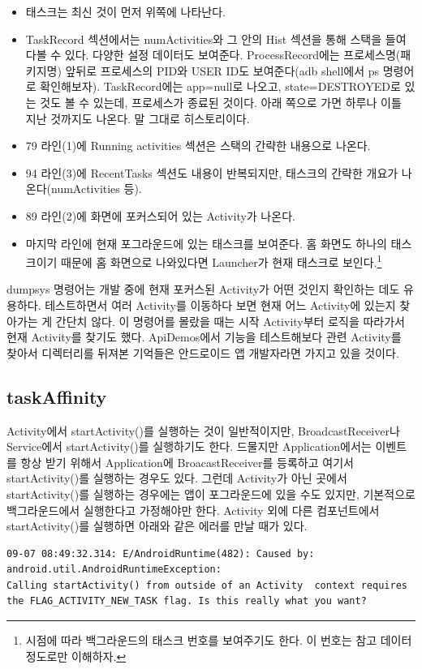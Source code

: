 \begin{itemize}
\item 태스크는 최신 것이 먼저 위쪽에 나타난다.
\item TaskRecord 섹션에서는 numActivities와 그 안의 Hist 섹션을 통해 스택을 들여다볼 수 있다. 다양한 설정 데이터도 보여준다. ProcessRecord에는 프로세스명(패키지명) 앞뒤로 프로세스의 PID와 USER ID도 보여준다(adb shell에서 ps 명령어로 확인해보자).
TaskRecord에는 app=null로 나오고, state=DESTROYED로 있는 것도 볼 수 있는데, 프로세스가 종료된 것이다. 아래 쪽으로 가면 하루나 이틀 지난 것까지도 나온다. 말 그대로 히스토리이다. 
\item 79 라인(1)에 Running activities 섹션은 스택의 간략한 내용으로 나온다.
\item 94 라인(3)에 RecentTasks 섹션도 내용이 반복되지만, 태스크의 간략한 개요가 나온다(numActivities 등).
\item 89 라인(2)에 화면에 포커스되어 있는 Activity가 나온다.
\item 마지막 라인에 현재 포그라운드에 있는 태스크를 보여준다. 홈 화면도 하나의 태스크이기 때문에 홈 화면으로 나와있다면 Launcher가 현재 태스크로 보인다.\footnote{시점에 따라 백그라운드의 태스크 번호를 보여주기도 한다. 이 번호는 참고 데이터 정도로만 이해하자.}
\end{itemize}
dumpsys 명령어는 개발 중에 현재 포커스된 Activity가 어떤 것인지 확인하는 데도 유용하다.
테스트하면서 여러 Activity를 이동하다 보면 현재 어느 Activity에 있는지 찾아가는 게 간단치 않다.
이 명령어를 몰랐을 때는 시작 Activity부터 로직을 따라가서 현재 Activity를 찾기도 했다. ApiDemos에서 기능을 테스트해보다 관련 Activity를 찾아서 디렉터리를 뒤져본 기억들은 안드로이드 앱 개발자라면 가지고 있을 것이다.

\subsection{taskAffinity}
Activity에서 startActivity()를 실행하는 것이 일반적이지만, BroadcastReceiver나 Service에서 startActivity()를 실행하기도 한다. 드물지만 Application에서는 이벤트를 항상 받기 위해서 Application에 BroacastReceiver를 등록하고 여기서 startActivity()를 실행하는 경우도 있다.
그런데 Activity가 아닌 곳에서 startActivity()를 실행하는 경우에는 앱이 포그라운드에 있을 수도 있지만, 기본적으로 백그라운드에서 실행한다고 가정해야만 한다. Activity 외에 다른 컴포넌트에서 startActivity()를 실행하면 아래와 같은 에러를 만날 때가 있다.
\begin{lstlisting}[frame=single]
09-07 08:49:32.314: E/AndroidRuntime(482): Caused by: android.util.AndroidRuntimeException: 
Calling startActivity() from outside of an Activity  context requires 
the FLAG_ACTIVITY_NEW_TASK flag. Is this really what you want?
\end{lstlisting}

